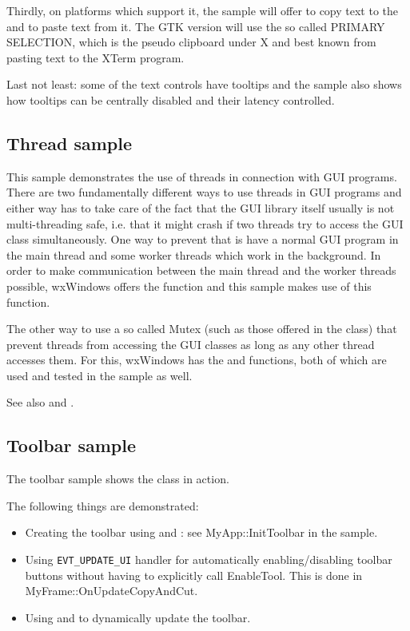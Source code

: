 Thirdly, on platforms which support it, the sample will offer to copy text to the 
 and to paste text from it. The GTK version will
use the so called PRIMARY SELECTION, which is the pseudo clipboard under X and
best known from pasting text to the XTerm program.

Last not least: some of the text controls have tooltips and the sample also shows
how tooltips can be centrally disabled and their latency controlled.


\subsection{Thread sample}\label{samplethread}

This sample demonstrates the use of threads in connection with GUI programs.
There are two fundamentally different ways to use threads in GUI programs and
either way has to take care of the fact that the GUI library itself usually
is not multi-threading safe, i.e. that it might crash if two threads try to
access the GUI class simultaneously. One way to prevent that is have a normal
GUI program in the main thread and some worker threads which work in the 
background. In order to make communication between the main thread and the
worker threads possible, wxWindows offers the  
function and this sample makes use of this function.

The other way to use a so called Mutex (such as those offered in the  
class) that prevent threads from accessing the GUI classes as long as any other
thread accesses them. For this, wxWindows has the  
and  functions, both of which are
used and tested in the sample as well.

See also  and .


\subsection{Toolbar sample}\label{sampletoolbar}

The toolbar sample shows the  class in action.

The following things are demonstrated:

\begin{itemize}\itemsep=0pt
\item Creating the toolbar using  
and : see
MyApp::InitToolbar in the sample.
\item Using {\tt EVT\_UPDATE\_UI} handler for automatically enabling/disabling
toolbar buttons without having to explicitly call EnableTool. This is done
in MyFrame::OnUpdateCopyAndCut.
\item Using  and 
 to dynamically update the
toolbar.
\end{itemize}

